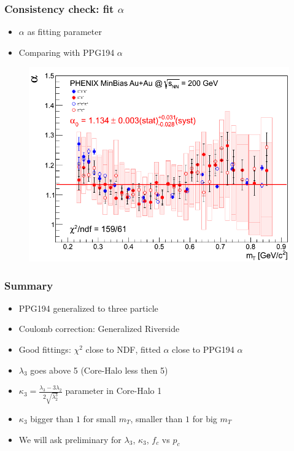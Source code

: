 \documentclass{beamer}
\begin{document}
\begin{frame}
\frametitle{Consistency check: fit $\alpha$}
\begin{itemize}
\setlength{\itemsep}{10pt}
\item $\alpha$ as fitting parameter 
\item Comparing with PPG194 $\alpha$
\end{itemize}
\begin{figure}
\includegraphics[scale=0.4]{pic/alpha}
\end{figure}
\end{frame}

\begin{frame}
\frametitle{Summary}
\begin{itemize}
\setlength{\itemsep}{18pt}
\item PPG194 generalized to three particle
\item Coulomb correction: Generalized Riverside
\item Good fittings: $\chi^2$ close to NDF, fitted $\alpha$ close to PPG194 $\alpha$
\item $\lambda_3$ goes above 5 (Core-Halo less then 5)
\item $\kappa_3=\frac{\lambda_3-3\lambda_2}{2\sqrt{\lambda_2^3}}$ parameter in Core-Halo 1
\item $\kappa_3$ bigger than $1$ for small $m_T$, smaller than $1$ for big $m_T$
\item We will ask preliminary for $\lambda_3$, $\kappa_3$, $f_c$ vs $p_c$
\end{itemize}

\end{frame}
\end{document}
